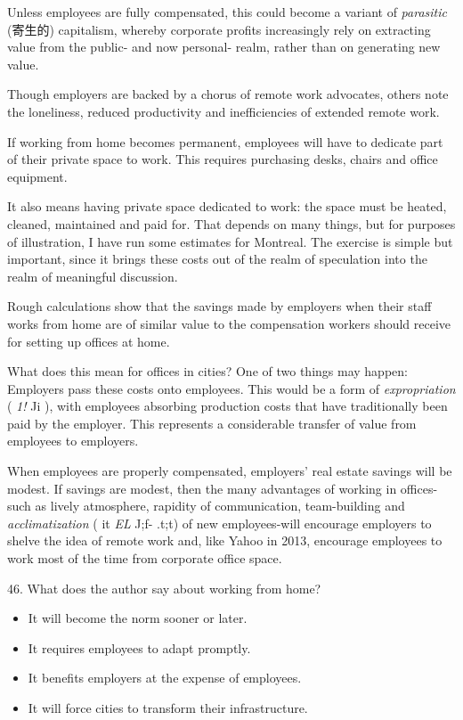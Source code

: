 \documentclass[UTF8,11pt]{ctexart}
\begin{document}
Unless employees are fully compensated, this could become a variant of \textit{parasitic} (寄生的) capitalism, whereby corporate profits increasingly rely on extracting value from the public- and now personal- realm, rather than on generating new value.


Though employers are backed by a chorus of remote work advocates, others note the loneliness, reduced productivity and inefficiencies of extended remote work.


If working from home becomes permanent, employees will have to dedicate part of their private space to work. This requires purchasing desks, chairs and office equipment.


It also means having private space dedicated to work: the space must be heated, cleaned, maintained and paid for. That depends on many things, but for purposes of illustration, I have run some estimates for Montreal. The exercise is simple but important, since it brings these costs out of the realm of speculation into the realm of meaningful discussion.


Rough calculations show that the savings made by employers when their staff works from home are of similar value to the compensation workers should receive for setting up offices at home.


What does this mean for offices in cities? One of two things may happen: Employers pass these costs onto employees. This would be a form of \textit{expropriation }( \textit{1! }Ji ), with employees absorbing production costs that have traditionally been paid by the employer. This represents a considerable transfer of value from employees to employers.


When employees are properly compensated, employers' real estate savings will be modest. If savings are modest, then the many advantages of working in offices-such as lively atmosphere, rapidity of communication, team-building and \textit{acclimatization} ( it \textit{EL }J;f- .t;t) of new employees-will encourage employers to shelve the idea of remote work and, like Yahoo in 2013, encourage employees to work most of the time from corporate office space.


46. What does the author say about working from home?


\begin{itemize}[leftmargin=2em,itemsep=.2em,topsep=.4em]\item[A.] It will become the norm sooner or later.
\item[B.] It requires employees to adapt promptly.
\item[C.] It benefits employers at the expense of employees.
\item[D.] It will force cities to transform their infrastructure.
\end{itemize}
\end{document}
